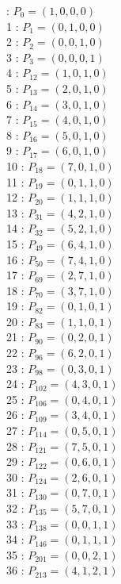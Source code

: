 \documentclass{article}
\begin{document}
{\begin{multicols}{3}
 : $P_{0}=( 1, 0, 0, 0 )$\\
1 : $P_{1}=( 0, 1, 0, 0 )$\\
2 : $P_{2}=( 0, 0, 1, 0 )$\\
3 : $P_{3}=( 0, 0, 0, 1 )$\\
4 : $P_{12}=( 1, 0, 1, 0 )$\\
5 : $P_{13}=( 2, 0, 1, 0 )$\\
6 : $P_{14}=( 3, 0, 1, 0 )$\\
7 : $P_{15}=( 4, 0, 1, 0 )$\\
8 : $P_{16}=( 5, 0, 1, 0 )$\\
9 : $P_{17}=( 6, 0, 1, 0 )$\\
10 : $P_{18}=( 7, 0, 1, 0 )$\\
11 : $P_{19}=( 0, 1, 1, 0 )$\\
12 : $P_{20}=( 1, 1, 1, 0 )$\\
13 : $P_{31}=( 4, 2, 1, 0 )$\\
14 : $P_{32}=( 5, 2, 1, 0 )$\\
15 : $P_{49}=( 6, 4, 1, 0 )$\\
16 : $P_{50}=( 7, 4, 1, 0 )$\\
17 : $P_{69}=( 2, 7, 1, 0 )$\\
18 : $P_{70}=( 3, 7, 1, 0 )$\\
19 : $P_{82}=( 0, 1, 0, 1 )$\\
20 : $P_{83}=( 1, 1, 0, 1 )$\\
21 : $P_{90}=( 0, 2, 0, 1 )$\\
22 : $P_{96}=( 6, 2, 0, 1 )$\\
23 : $P_{98}=( 0, 3, 0, 1 )$\\
24 : $P_{102}=( 4, 3, 0, 1 )$\\
25 : $P_{106}=( 0, 4, 0, 1 )$\\
26 : $P_{109}=( 3, 4, 0, 1 )$\\
27 : $P_{114}=( 0, 5, 0, 1 )$\\
28 : $P_{121}=( 7, 5, 0, 1 )$\\
29 : $P_{122}=( 0, 6, 0, 1 )$\\
30 : $P_{124}=( 2, 6, 0, 1 )$\\
31 : $P_{130}=( 0, 7, 0, 1 )$\\
32 : $P_{135}=( 5, 7, 0, 1 )$\\
33 : $P_{138}=( 0, 0, 1, 1 )$\\
34 : $P_{146}=( 0, 1, 1, 1 )$\\
35 : $P_{201}=( 0, 0, 2, 1 )$\\
36 : $P_{213}=( 4, 1, 2, 1 )$\\

\end{multicols}}
\end{document}

